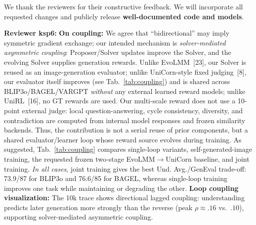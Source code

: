 \documentclass[10pt,twocolumn,letterpaper]{article}
\title{}
\newcommand{\rOne}{\textcolor{revone}{\textbf{Reviewer ksp6:}}}
\newcommand{\pt}[1]{\textcolor{pointblue}{\textbf{#1}}}
\begin{document}
\maketitle
\thispagestyle{empty}


We thank the reviewers for their constructive feedback. We will incorporate all requested changes and publicly release \textbf{well-documented code and models}.

\rOne{} \pt{On coupling:} We agree that ``bidirectional'' may imply symmetric gradient exchange; our intended mechanism is \emph{solver-mediated asymmetric coupling}: Proposer/Solver updates improve the Solver, and the evolving Solver supplies generation rewards. Unlike EvoLMM~[23], our Solver is reused as an image-generation evaluator; unlike UniCorn-style fixed judging~[8], our evaluator itself improves (see Tab.~\ref{tab:coupling}) and is shared across BLIP3o/BAGEL/VARGPT \textit{without} any external learned reward models; unlike UniRL~[16], no GT rewards are used. Our multi-scale reward does not use a 10-point external judge: local question-answering, cycle consistency, diversity, and contradiction are computed from internal model responses and frozen similarity backends. Thus, the contribution is not a serial reuse of prior components, but a shared evaluator/learner loop whose reward source evolves during training. As suggested, Tab.~\ref{tab:coupling} compares single-loop variants, self-generated-image training, the requested frozen two-stage EvoLMM$\to$UniCorn baseline, and joint training. \emph{In all cases}, joint training gives the best Und. Avg./GenEval trade-off: 73.9/87 for BLIP3o and 76.6/85 for BAGEL, whereas single-loop training improves one task while maintaining or degrading the other. \pt{Loop coupling visualization:} The 10k trace shows directional lagged coupling: understanding predicts later generation more strongly than the reverse (peak $\rho{\approx}.16$ vs.\ $.10$), supporting solver-mediated asymmetric coupling.
\end{document}
